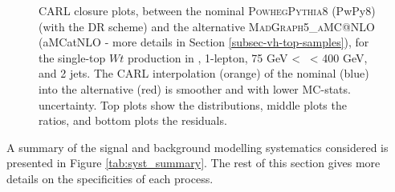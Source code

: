\begin{figure}[!htbp]
    \centering
      \caption{CARL closure plots, between the nominal \textsc{Powheg}\textsc{Pythia}8 (PwPy8) (with the DR scheme) and the alternative \textsc{MadGraph5\_aMC@NLO} (aMCatNLO - more details in Section \ref{subsec-vh-top-samples}), for the single-top $Wt$ production in \vhb, 1-lepton, 75 GeV < \ptv\ < 400 GeV, and 2 jets. The CARL interpolation (orange) of the nominal (blue) into the alternative (red) is smoother and with lower MC-stats. uncertainty. Top plots show the distributions, middle plots the ratios, and bottom plots the residuals.}
      \label{fig:carl:resolved_closure_stopWt}
  \end{figure}
  
A summary of the signal and background modelling systematics considered is presented in Figure \ref{tab:syst_summary}. The rest of this section gives more details on the specificities of each process. 


